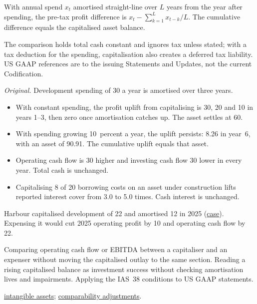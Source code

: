 \begin{qfmethod}
 With annual spend $x_t$ amortised straight-line over $L$ years from the year after spending, the pre-tax profit difference is $x_t-\sum_{k=1}^{L}x_{t-k}/L$. The cumulative difference equals the capitalised asset balance.

 The comparison holds total cash constant and ignores tax unless stated; with a tax deduction for the spending, capitalisation also creates a deferred tax liability. US GAAP references are to the issuing Statements and Updates, not the current Codification.

 \emph{Original.} Development spending of 30 a year is amortised over three years.
\begin{itemize}
\item With constant spending, the profit uplift from capitalising is 30, 20 and 10 in years 1--3, then zero once amortisation catches up. The asset settles at 60.
\item With spending growing 10~percent a year, the uplift persists: 8.26 in year~6, with an asset of 90.91. The cumulative uplift equals that asset.
\item Operating cash flow is 30 higher and investing cash flow 30 lower in every year. Total cash is unchanged.
\item Capitalising 8 of 20 borrowing costs on an asset under construction lifts reported interest cover from 3.0 to 5.0 times. Cash interest is unchanged.
\end{itemize}
Harbour capitalised development of 22 and amortised 12 in 2025 (\hyperref[ex:harbour-tools-statements]{case}). Expensing it would cut 2025 operating profit by 10 and operating cash flow by 22.

 Comparing operating cash flow or EBITDA between a capitaliser and an expenser without moving the capitalised outlay to the same section. Reading a rising capitalised balance as investment success without checking amortisation lives and impairments. Applying the IAS~38 conditions to US GAAP statements.

 \hyperref[meth:intangible-acquisition-routes]{intangible assets}; \hyperref[meth:accounting-analysis-adjustments]{comparability adjustments}.

\end{qfmethod}

